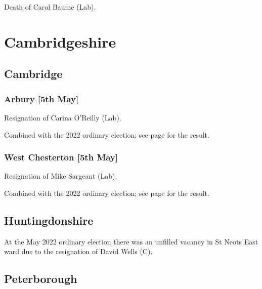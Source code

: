 \documentclass[a4paper,openany]{book}
\begin{document}
\begin{resultsiii}

Death of Carol Baume (Lab).

\section{Cambridgeshire}

\subsection*{Cambridge}

\subsubsection*{Arbury \hspace*{\fill}\nolinebreak[1]%
	\enspace\hspace*{\fill}
	[5th May]}


Resignation of Carina O'Reilly (Lab).

Combined with the 2022 ordinary election; see page \pageref{CambridgeArbury} for the result.

\subsubsection*{West Chesterton \hspace*{\fill}\nolinebreak[1]%
	\enspace\hspace*{\fill}
	[5th May]}


Resignation of Mike Sargeant (Lab).

Combined with the 2022 ordinary election; see page \pageref{CambridgeWestChesterton} for the result.

\subsection*{Huntingdonshire}

At the May 2022 ordinary election there was an unfilled vacancy in St Neots East ward due to the resignation of David Wells (C).%

\subsection*{Peterborough}


\end{resultsiii}
\end{document}

